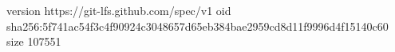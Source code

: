 version https://git-lfs.github.com/spec/v1
oid sha256:5f741ac54f3c4f90924c3048657d65eb384bae2959cd8d11f9996d4f15140c60
size 107551
